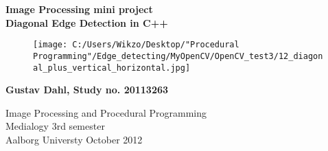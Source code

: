 \thispagestyle{empty} %
\hspace{6cm} \vspace{6cm}
\begin{center}
\textbf{\Huge {Image Processing mini project}\\ \vspace{1cm}
\huge{Diagonal Edge Detection in C++}}

\begin{figure} [H]
\texttt{[image: C:/Users/Wikzo/Desktop/"Procedural Programming"/Edge\_detecting/MyOpenCV/OpenCV\_test3/12\_diagonal\_plus\_vertical\_horizontal.jpg]}
\centering
\label{building_diagonal_edge}
\end{figure}
\end{center}

\begin{center}
\Large{\textbf{Gustav Dahl, Study no. 20113263}}
\end{center}
\vfill
Image Processing and Procedural Programming\\
Medialogy 3rd semester\\
Aalborg Universty October 2012\\
\thispagestyle{empty}
\setcounter{page}{0}